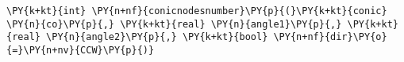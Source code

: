 \begin{Verbatim}[commandchars=\\\{\}]
    \PY{k+kt}{int} \PY{n+nf}{conicnodesnumber}\PY{p}{(}\PY{k+kt}{conic} \PY{n}{co}\PY{p}{,} \PY{k+kt}{real} \PY{n}{angle1}\PY{p}{,} \PY{k+kt}{real} \PY{n}{angle2}\PY{p}{,} \PY{k+kt}{bool} \PY{n+nf}{dir}\PY{o}{=}\PY{n+nv}{CCW}\PY{p}{)}
\end{Verbatim}
